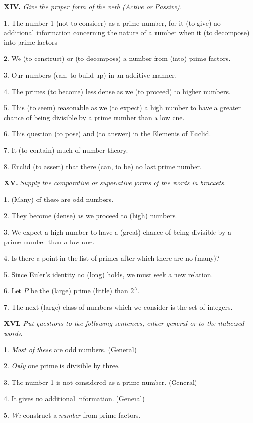 \documentclass[a4paper]{article}
\newcommand{\ETask}[2]{\medskip\par\textbf{#1.} \textit{#2}\par}
\begin{document}
\ETask{XIV}{Give the proper form of the verb (Active or Passive).}

1. The number 1 (not to consider) as a prime number, for it (to give) no additional information concerning the nature
of a number when it (to decompose) into prime factors.

2. We (to construct) or (to decompose) a number from (into) prime factors.

3. Our numbers (can, to build up) in an additive manner.

4. The primes (to become) less dense as we (to proceed) to higher numbers.

5. This (to seem) reasonable as we (to expect) a high number to have a greater chance of being divisible by a prime
number than a low one.

6. This question (to pose) and (to answer) in the Elements of Euclid.

7. It (to contain) much of number theory.

8. Euclid (to assert) that there (can, to be) no last prime number.

\ETask{XV}{Supply the comparative or superlative forms of the words in brackets.}

1. (Many) of these are odd numbers.

2. They become (dense) as we proceed to (high) numbers.

3. We expect a high number to have a (great) chance of being divisible by a prime number than a low one.

4. Is there a point in the list of primes after which there are no (many)?

5. Since Euler's identity no (long) holds, we must seek a new relation.

6. Let $P$ be the (large) prime (little) than $2^N$.

7. The next (large) class of numbers which we consider is the set of integers.

\ETask{XVI}{Put questions to the following sentences, either general or to the italicized words.}

1. \textit{Most of these} are odd numbers. (General)

2. \textit{Only} one prime is divisible by three.

3. The number 1 is not considered as a prime number. (General)

4. It gives no additional information. (General)

5. \textit{We} construct a \textit{number} from prime factors.
\end{document}
